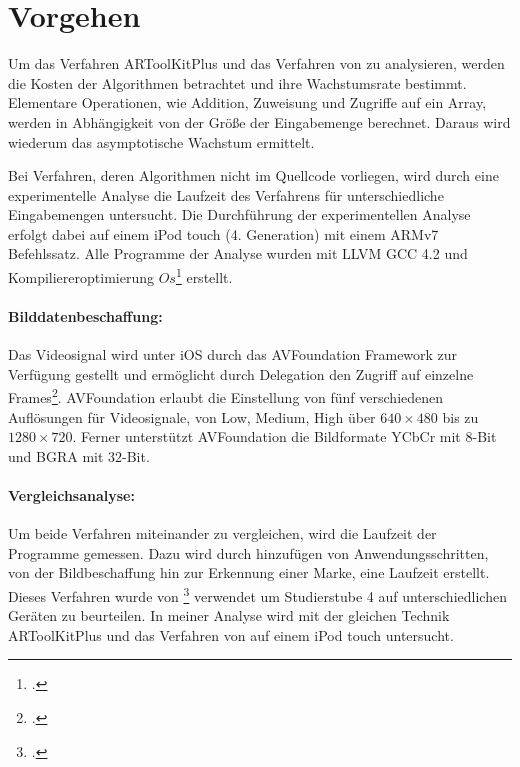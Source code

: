 \section{Vorgehen} %
\label{sec:vorgehen}
\begin{comment}
	Vorgehen: Analysemethoden vorstellen wie Algorithmen untersucht werden.
	Vergleich O-Notation
	Laufzeitanalyse
	Gleiche Kriterien (selbes Bild, selbes Video)
\end{comment}

Um das Verfahren ARToolKitPlus und das Verfahren von \citeauthor{hirzer08} zu analysieren, werden die Kosten der
 Algorithmen betrachtet und ihre Wachstumsrate bestimmt. Elementare Operationen, wie Addition, Zuweisung und
 Zugriffe auf ein Array, werden in Abhängigkeit von der Größe der Eingabemenge berechnet. Daraus wird wiederum das
 asymptotische Wachstum ermittelt.

Bei Verfahren, deren Algorithmen nicht im Quellcode vorliegen, wird durch eine experimentelle Analyse die Laufzeit des
 Verfahrens für unterschiedliche Eingabemengen untersucht. Die Durchführung der experimentellen Analyse erfolgt dabei
 auf einem iPod touch (4. Generation) mit einem ARMv7 Befehlssatz. Alle Programme der Analyse wurden mit
 LLVM GCC 4.2 und Kompiliereroptimierung $\mathit{Os}$\footcite[Vgl.][]{cc} erstellt.

\paragraph{Bilddatenbeschaffung:} %
\label{par:bilddatenbeschaffung}
Das Videosignal wird unter iOS durch das AVFoundation Framework zur Verfügung gestellt und ermöglicht durch Delegation
 den Zugriff auf einzelne Frames\footcite{avfoundation}. AVFoundation erlaubt die Einstellung von fünf verschiedenen
 Auflösungen für Videosignale, von Low, Medium, High über $640 \times 480$ bis zu $1280 \times 720$. Ferner unterstützt
 AVFoundation die Bildformate YCbCr mit $8$-Bit und BGRA mit $32$-Bit.

\paragraph{Vergleichsanalyse:} %
\label{par:vergleichsanalyse}
Um beide Verfahren miteinander zu vergleichen, wird die Laufzeit der Programme gemessen. Dazu wird durch hinzufügen von
 Anwendungsschritten, von der Bildbeschaffung hin zur Erkennung einer Marke, eine Laufzeit erstellt. Dieses Verfahren
 wurde von \citeauthor{wagner09b}\footcite[Vgl.][]{wagner09b} verwendet um Studierstube 4 auf unterschiedlichen Geräten
 zu beurteilen. In meiner Analyse wird mit der gleichen Technik ARToolKitPlus und das Verfahren von
 \citeauthor{hirzer08} auf einem iPod touch untersucht.

